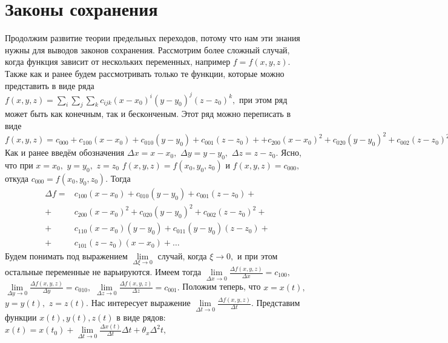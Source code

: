 \chapter{Законы сохранения}
Продолжим развитие теории предельных переходов, потому что нам
эти знания нужны для выводов законов сохранения.
Рассмотрим более сложный случай, когда функция зависит от нескольких
переменных, например $f=f(x,y,z).$ 
Также как и ранее будем рассмотривать только те функции, которые можно представить
в виде ряда $f(x,y,z) = \sum\limits_{i}\sum\limits_{j}
\sum\limits_{k}c_{ijk} (x-x_0)^i(y-y_0)^j(z-z_0)^k,$ при этом
ряд может быть как конечным, так и бесконченым.
Этот ряд можно переписать в виде $f(x,y,z) = c_{000}
+c_{100}(x-x_0) + c_{010} (y-y_0) + c_{001} (z-z_0) + 
+c_{200}(x-x_0)^2 + c_{020} (y-y_0)^2 + c_{002} (z-z_0)^2 + 
+c_{110}(x-x_0)(y-y_0) + c_{011} (y-y_0)(z-z_0) + c_{101} (z-z_0)(x-x_0) + \dots.$
Как и ранее введём обозначения 
$\Delta x = x-x_0,$
$\Delta y = y-y_0,$
$\Delta z = z-z_0.$
Ясно, что при $x=x_0,$ $y=y_0,$ $z=z_0$ $f(x,y,z)=f(x_0,y_0,z_0)$ и 
$f(x,y,z) = c_{000},$ откуда $c_{000} = f(x_0,y_0,z_0).$
Тогда 
\begin{equation}
\label{eq:full_add}
\begin{split}
\Delta f 
=&c_{100}(x-x_0) + c_{010} (y-y_0) + c_{001} (z-z_0)  +\\
+&c_{200}(x-x_0)^2 + c_{020} (y-y_0)^2 + c_{002} (z-z_0)^2  +\\
+&c_{110}(x-x_0)(y-y_0)+c_{011} (y-y_0)(z-z_0)+\\
+&c_{101} (z-z_0)(x-x_0) + \dots  %
\end{split}
\end{equation}
Будем понимать под выражением $\lim\limits_{\Delta \xi \to 0}$ случай, когда
$\xi \to 0,$ и при этом остальные переменные не варьируются. Имеем тогда
$\lim\limits_{\Delta x \to 0} \frac{\Delta f(x,y,z)}{\Delta x} = c_{100},$
$\lim\limits_{\Delta y \to 0} \frac{\Delta f(x,y,z)}{\Delta y} = c_{010},$
$\lim\limits_{\Delta z \to 0} \frac{\Delta f(x,y,z)}{\Delta z} = c_{001}.$
Положим теперь, что  $x = x(t),$ $y=y(t),$ $z=z(t).$ Нас интересует
выражение 
$\lim\limits_{\Delta t \to 0} \frac{\Delta f(x,y,z)}{\Delta t}.$
Представим функции $x(t), y(t), z(t)$ в виде рядов:
$x(t) = x(t_0) + \lim \limits_{\Delta t \to 0} \frac {\Delta x (t)} {\Delta t} \Delta t + \theta_x \Delta^2 t ,$
